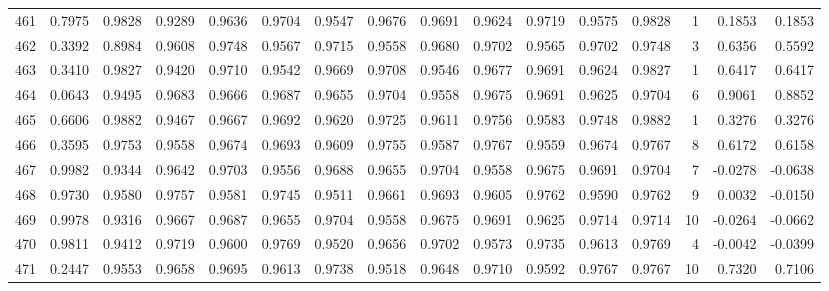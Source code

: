 \begin{tabular}{lrrrrrrrrrrrrrrr}
461 &      0.7975 &  0.9828 &  0.9289 &  0.9636 &  0.9704 &  0.9547 &  0.9676 &  0.9691 &  0.9624 &  0.9719 &   0.9575 &     0.9828 &      1 &                    0.1853 &                     0.1853 \\
462 &      0.3392 &  0.8984 &  0.9608 &  0.9748 &  0.9567 &  0.9715 &  0.9558 &  0.9680 &  0.9702 &  0.9565 &   0.9702 &     0.9748 &      3 &                    0.6356 &                     0.5592 \\
463 &      0.3410 &  0.9827 &  0.9420 &  0.9710 &  0.9542 &  0.9669 &  0.9708 &  0.9546 &  0.9677 &  0.9691 &   0.9624 &     0.9827 &      1 &                    0.6417 &                     0.6417 \\
464 &      0.0643 &  0.9495 &  0.9683 &  0.9666 &  0.9687 &  0.9655 &  0.9704 &  0.9558 &  0.9675 &  0.9691 &   0.9625 &     0.9704 &      6 &                    0.9061 &                     0.8852 \\
465 &      0.6606 &  0.9882 &  0.9467 &  0.9667 &  0.9692 &  0.9620 &  0.9725 &  0.9611 &  0.9756 &  0.9583 &   0.9748 &     0.9882 &      1 &                    0.3276 &                     0.3276 \\
466 &      0.3595 &  0.9753 &  0.9558 &  0.9674 &  0.9693 &  0.9609 &  0.9755 &  0.9587 &  0.9767 &  0.9559 &   0.9674 &     0.9767 &      8 &                    0.6172 &                     0.6158 \\
467 &      0.9982 &  0.9344 &  0.9642 &  0.9703 &  0.9556 &  0.9688 &  0.9655 &  0.9704 &  0.9558 &  0.9675 &   0.9691 &     0.9704 &      7 &                   -0.0278 &                    -0.0638 \\
468 &      0.9730 &  0.9580 &  0.9757 &  0.9581 &  0.9745 &  0.9511 &  0.9661 &  0.9693 &  0.9605 &  0.9762 &   0.9590 &     0.9762 &      9 &                    0.0032 &                    -0.0150 \\
469 &      0.9978 &  0.9316 &  0.9667 &  0.9687 &  0.9655 &  0.9704 &  0.9558 &  0.9675 &  0.9691 &  0.9625 &   0.9714 &     0.9714 &     10 &                   -0.0264 &                    -0.0662 \\
470 &      0.9811 &  0.9412 &  0.9719 &  0.9600 &  0.9769 &  0.9520 &  0.9656 &  0.9702 &  0.9573 &  0.9735 &   0.9613 &     0.9769 &      4 &                   -0.0042 &                    -0.0399 \\
471 &      0.2447 &  0.9553 &  0.9658 &  0.9695 &  0.9613 &  0.9738 &  0.9518 &  0.9648 &  0.9710 &  0.9592 &   0.9767 &     0.9767 &     10 &                    0.7320 &                     0.7106 \\

\end{tabular}

